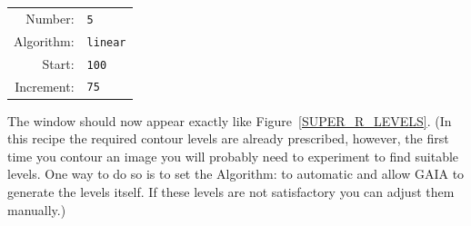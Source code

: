 \documentclass[twoside,11pt]{starlink}
\begin{document}
\begin{enumerate}
  \begin{center}
  \begin{tabular}{rl}
   \textsf{Number:}    & \texttt{5} \\
   \textsf{Algorithm:} & \texttt{linear} \\
   \textsf{Start:}     & \texttt{100} \\
   \textsf{Increment:} & \texttt{75} \\
  \end{tabular}
  \end{center}

   The window should now appear exactly like Figure~\ref{SUPER_R_LEVELS}.
   (In this recipe the required contour levels are already prescribed,
   however, the first time you contour an image you will probably need
   to experiment to find suitable levels.  One way to do so is to set the
   \textsf{Algorithm:} to \textsf{automatic} and allow GAIA to generate the
   levels itself.  If these levels are not satisfactory you can adjust
   them manually.)


\end{enumerate}
\end{document}
